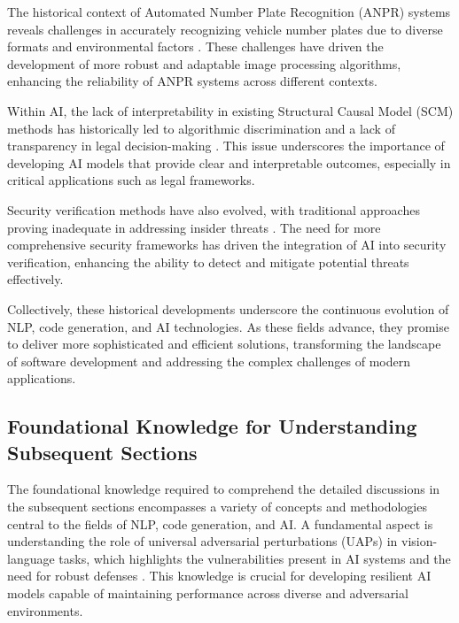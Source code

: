 The historical context of Automated Number Plate Recognition (ANPR) systems reveals challenges in accurately recognizing vehicle number plates due to diverse formats and environmental factors \cite{adak2022automaticnumberplaterecognition}. These challenges have driven the development of more robust and adaptable image processing algorithms, enhancing the reliability of ANPR systems across different contexts.



Within AI, the lack of interpretability in existing Structural Causal Model (SCM) methods has historically led to algorithmic discrimination and a lack of transparency in legal decision-making \cite{lin2023interpretabilityframeworksimilarcase}. This issue underscores the importance of developing AI models that provide clear and interpretable outcomes, especially in critical applications such as legal frameworks.



Security verification methods have also evolved, with traditional approaches proving inadequate in addressing insider threats \cite{kammller2020applyingisabelleinsiderframework}. The need for more comprehensive security frameworks has driven the integration of AI into security verification, enhancing the ability to detect and mitigate potential threats effectively.



Collectively, these historical developments underscore the continuous evolution of NLP, code generation, and AI technologies. As these fields advance, they promise to deliver more sophisticated and efficient solutions, transforming the landscape of software development and addressing the complex challenges of modern applications.



\subsection{Foundational Knowledge for Understanding Subsequent Sections} \label{subsec:Foundational Knowledge for Understanding Subsequent Sections}

The foundational knowledge required to comprehend the detailed discussions in the subsequent sections encompasses a variety of concepts and methodologies central to the fields of NLP, code generation, and AI. A fundamental aspect is understanding the role of universal adversarial perturbations (UAPs) in vision-language tasks, which highlights the vulnerabilities present in AI systems and the need for robust defenses \cite{zhang2024universaladversarialperturbationsvisionlanguage}. This knowledge is crucial for developing resilient AI models capable of maintaining performance across diverse and adversarial environments.



